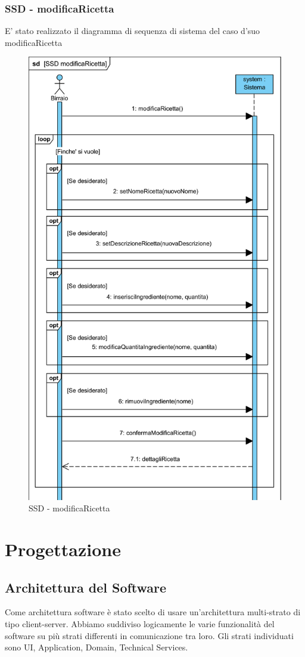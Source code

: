 \documentclass[a4paper,12pt]{report}
\begin{document}
		\subsection{SSD - modificaRicetta}
			E' stato realizzato il diagramma di sequenza di sistema del caso d'suo modificaRicetta
			\begin{figure}[!h]
				\centering
				\includegraphics[width=0.7\linewidth]{image/SSD-modificaRicetta.png}
				\caption{SSD - modificaRicetta}\label{fig:1}
			\end{figure}


      \chapter{Progettazione}
     
         \section{Architettura del Software}
Come architettura software è stato scelto di usare un'architettura multi-strato di tipo client-server. Abbiamo suddiviso logicamente le varie funzionalità del software su più strati differenti in comunicazione tra loro. Gli strati individuati sono UI, Application, Domain, Technical Services.
\end{document}
